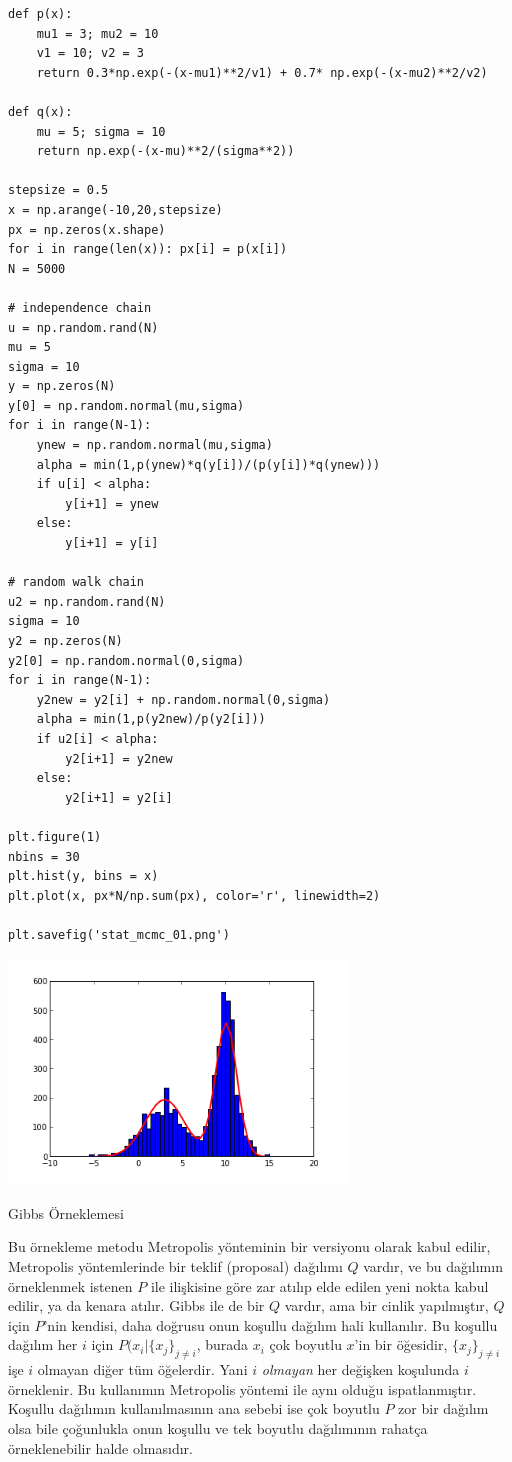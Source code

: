\documentclass[12pt,fleqn]{article}\usepackage{../../common}
\begin{document}
\begin{verbatim}
def p(x):
    mu1 = 3; mu2 = 10
    v1 = 10; v2 = 3
    return 0.3*np.exp(-(x-mu1)**2/v1) + 0.7* np.exp(-(x-mu2)**2/v2)

def q(x):
    mu = 5; sigma = 10
    return np.exp(-(x-mu)**2/(sigma**2))

stepsize = 0.5
x = np.arange(-10,20,stepsize)
px = np.zeros(x.shape)
for i in range(len(x)): px[i] = p(x[i])
N = 5000

# independence chain
u = np.random.rand(N)
mu = 5
sigma = 10
y = np.zeros(N)
y[0] = np.random.normal(mu,sigma)
for i in range(N-1):
    ynew = np.random.normal(mu,sigma)
    alpha = min(1,p(ynew)*q(y[i])/(p(y[i])*q(ynew)))
    if u[i] < alpha:
        y[i+1] = ynew
    else:
        y[i+1] = y[i]

# random walk chain
u2 = np.random.rand(N)
sigma = 10
y2 = np.zeros(N)
y2[0] = np.random.normal(0,sigma)
for i in range(N-1):
    y2new = y2[i] + np.random.normal(0,sigma)
    alpha = min(1,p(y2new)/p(y2[i]))
    if u2[i] < alpha:
        y2[i+1] = y2new
    else:
        y2[i+1] = y2[i]

plt.figure(1)
nbins = 30
plt.hist(y, bins = x)
plt.plot(x, px*N/np.sum(px), color='r', linewidth=2)

plt.savefig('stat_mcmc_01.png')
\end{verbatim}

\includegraphics[height=6cm]{stat_mcmc_01.png}

Gibbs Örneklemesi

Bu örnekleme metodu Metropolis yönteminin bir versiyonu olarak kabul
edilir, Metropolis yöntemlerinde bir teklif (proposal) dağılımı $Q$ vardır,
ve bu dağılımın örneklenmek istenen $P$ ile ilişkisine göre zar atılıp elde
edilen yeni nokta kabul edilir, ya da kenara atılır. Gibbs ile de bir $Q$
vardır, ama bir cinlik yapılmıştır, $Q$ için $P$'nin kendisi, daha doğrusu
onun koşullu dağılım hali kullanılır. Bu koşullu dağılım her $i$ için
$P(x_i|\{x_j\}_{j \ne i}$, burada $x_i$ çok boyutlu $x$'in bir öğesidir,
$\{x_j\}_{j \ne i}$ işe $i$ olmayan diğer tüm öğelerdir. Yani $i$ {\em
  olmayan} her değişken koşulunda $i$ örneklenir. Bu kullanımın Metropolis
yöntemi ile aynı olduğu ispatlanmıştır. Koşullu dağılımın kullanılmasının
ana sebebi ise çok boyutlu $P$ zor bir dağılım olsa bile çoğunlukla onun
koşullu ve tek boyutlu dağılımının rahatça örneklenebilir halde olmasıdır.
\end{document}
